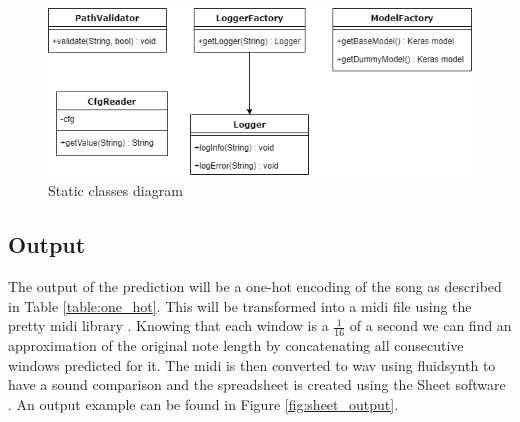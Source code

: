 \begin{figure}[H]
	\caption[Utils diagram]{ Static classes diagram }
	\centering
	\label{fig:utils_diag}
	\includegraphics[width=1\textwidth, height=\textheight, keepaspectratio]{"resources/utils_diagram"}
\end{figure}

\subsection{Output}
The output of the prediction will be a one-hot encoding of the song as described in Table \ref{table:one_hot}. This will be transformed into a midi file using the pretty midi library \cite{pretty_midi}. Knowing that each window is a $\frac{1}{16}$ of a second we can find an approximation of the original note length by concatenating all consecutive windows predicted for it. The midi is then converted to wav using fluidsynth \cite{fluidsynth} to have a sound comparison and the spreadsheet is created using the Sheet software \cite{sheet}. An output example can be found in Figure \ref{fig:sheet_output}.


